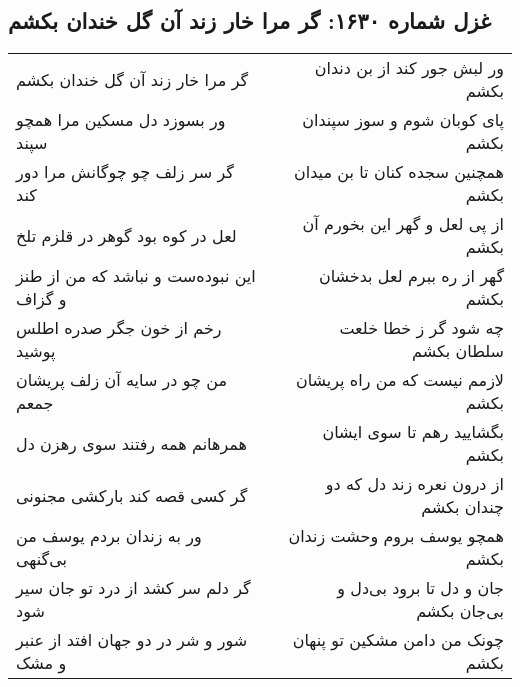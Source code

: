 \begin{center}
\section*{غزل شماره ۱۶۳۰: گر مرا خار زند آن گل خندان بکشم}
\label{sec:1630}
\begin{longtable}{l p{0.5cm} r}
گر مرا خار زند آن گل خندان بکشم
&&
ور لبش جور کند از بن دندان بکشم
\\
ور بسوزد دل مسکین مرا همچو سپند
&&
پای کوبان شوم و سوز سپندان بکشم
\\
گر سر زلف چو چوگانش مرا دور کند
&&
همچنین سجده کنان تا بن میدان بکشم
\\
لعل در کوه بود گوهر در قلزم تلخ
&&
از پی لعل و گهر این بخورم آن بکشم
\\
این نبوده‌ست و نباشد که من از طنز و گزاف
&&
گهر از ره ببرم لعل بدخشان بکشم
\\
رخم از خون جگر صدره اطلس پوشید
&&
چه شود گر ز خطا خلعت سلطان بکشم
\\
من چو در سایه آن زلف پریشان جمعم
&&
لازمم نیست که من راه پریشان بکشم
\\
همرهانم همه رفتند سوی رهزن دل
&&
بگشایید رهم تا سوی ایشان بکشم
\\
گر کسی قصه کند بارکشی مجنونی
&&
از درون نعره زند دل که دو چندان بکشم
\\
ور به زندان بردم یوسف من بی‌گنهی
&&
همچو یوسف بروم وحشت زندان بکشم
\\
گر دلم سر کشد از درد تو جان سیر شود
&&
جان و دل تا برود بی‌دل و بی‌جان بکشم
\\
شور و شر در دو جهان افتد از عنبر و مشک
&&
چونک من دامن مشکین تو پنهان بکشم
\\
\end{longtable}
\end{center}
